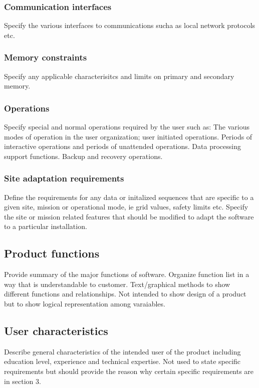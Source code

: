 \documentclass[10pt]{article}
\begin{document}
	  \subsubsection{Communication interfaces}
	  Specify the various interfaces to communications sucha as local network protocols etc.

	  \subsubsection{Memory constraints}
	  Specify any applicable characterisitcs and limits on primary and secondary memory.

	  \subsubsection{Operations}
	  Specify special and normal operations required by the user such as:
	  The various modes of operation in the user organization; user initiated operations.
	  Periods of interactive operations and periods of unattended operations.
	  Data processing support functions.
	  Backup and recovery operations.

	  \subsubsection{Site adaptation requirements}
	  Define the requirements for any data or initalized sequences that are specific to a given site, mission or operational mode, ie grid values, safety limits etc.
	  Specify the site or mission related features that should be modified to adapt the software to a particular installation. 

     \subsection{Product functions}
     Provide summary of the major functions of software. Organize function list in a way that is understandable to customer. Text/graphical methods to show different functions and relationships. Not intended to show design of a product but to show logical representation among varaiables.

     \subsection{User characteristics}
     Describe general characteristics of the intended user of the product including education level, experience and technical expertise. Not used to state specific requirements but should provide the reason why certain specific requirements are in section 3.
\end{document}
